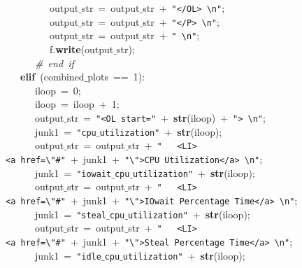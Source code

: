 \mbox{}\ \ \ \ \ \ \ \ \ output$\_$str\ =\ output$\_$str\ +\ \texttt{"{}\textless{}/OL\textgreater{}\ \textbackslash{}n"{}}; \\
\mbox{}\ \ \ \ \ \ \ \ \ output$\_$str\ =\ output$\_$str\ +\ \texttt{"{}\textless{}/P\textgreater{}\ \textbackslash{}n"{}}; \\
\mbox{}\ \ \ \ \ \ \ \ \ output$\_$str\ =\ output$\_$str\ +\ \texttt{"{}\ \textbackslash{}n"{}}; \\
\mbox{}\ \ \ \ \ \ \ \ \ f.\textbf{write}(output$\_$str); \\
\mbox{}\ \ \ \ \ \ \textit{\#\ end\ if} \\
\mbox{}\ \ \ \textbf{elif}\ (combined$\_$plots\ ==\ 1): \\
\mbox{}\ \ \ \ \ \ iloop\ =\ 0; \\
\mbox{}\ \ \ \ \ \ iloop\ =\ iloop\ +\ 1; \\
\mbox{}\ \ \ \ \ \ output$\_$str\ =\ \texttt{"{}\textless{}OL\ start="{}}\ +\ \textbf{str}(iloop)\ +\ \texttt{"{}\textgreater{}\ \textbackslash{}n"{}}; \\
\mbox{}\ \ \ \ \ \ junk1\ =\ \texttt{"{}cpu$\_$utilization"{}}\ +\ \textbf{str}(iloop); \\
\mbox{}\ \ \ \ \ \ output$\_$str\ =\ output$\_$str\ +\ \texttt{"{}\ \ \ \textless{}LI\textgreater{}\textless{}a\ href=\textbackslash{}"{}\#"{}}\ +\ junk1\ +\ \texttt{"{}\textbackslash{}"{}\textgreater{}CPU\ Utilization\textless{}/a\textgreater{}\ \textbackslash{}n"{}}; \\
\mbox{}\ \ \ \ \ \ junk1\ =\ \texttt{"{}iowait$\_$cpu$\_$utilization"{}}\ +\ \textbf{str}(iloop); \\
\mbox{}\ \ \ \ \ \ output$\_$str\ =\ output$\_$str\ +\ \texttt{"{}\ \ \ \textless{}LI\textgreater{}\textless{}a\ href=\textbackslash{}"{}\#"{}}\ +\ junk1\ +\ \texttt{"{}\textbackslash{}"{}\textgreater{}IOwait\ Percentage\ Time\textless{}/a\textgreater{}\ \textbackslash{}n"{}}; \\
\mbox{}\ \ \ \ \ \ junk1\ =\ \texttt{"{}steal$\_$cpu$\_$utilization"{}}\ +\ \textbf{str}(iloop); \\
\mbox{}\ \ \ \ \ \ output$\_$str\ =\ output$\_$str\ +\ \texttt{"{}\ \ \ \textless{}LI\textgreater{}\textless{}a\ href=\textbackslash{}"{}\#"{}}\ +\ junk1\ +\ \texttt{"{}\textbackslash{}"{}\textgreater{}Steal\ Percentage\ Time\textless{}/a\textgreater{}\ \textbackslash{}n"{}}; \\
\mbox{}\ \ \ \ \ \ junk1\ =\ \texttt{"{}idle$\_$cpu$\_$utilization"{}}\ +\ \textbf{str}(iloop); \\
